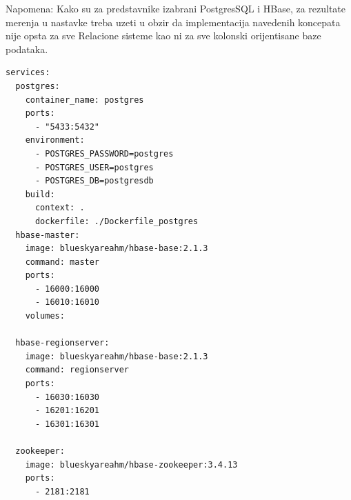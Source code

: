 \documentclass[12pt,oneside]{memoir}
\begin{document}
Napomena: Kako su za predstavnike izabrani PostgresSQL i HBase,  za rezultate merenja u nastavke treba uzeti u obzir da implementacija navedenih koncepata nije opsta za sve Relacione sisteme kao ni za sve kolonski orijentisane baze podataka.



\begin{lstlisting}[title={docker-compose.yml},captionpos=t]
services: 
  postgres:
    container_name: postgres
    ports:
      - "5433:5432"
    environment:
      - POSTGRES_PASSWORD=postgres
      - POSTGRES_USER=postgres
      - POSTGRES_DB=postgresdb
    build:
      context: .
      dockerfile: ./Dockerfile_postgres
  hbase-master:
    image: blueskyareahm/hbase-base:2.1.3
    command: master
    ports:
      - 16000:16000
      - 16010:16010
    volumes:

  hbase-regionserver:
    image: blueskyareahm/hbase-base:2.1.3
    command: regionserver
    ports:
      - 16030:16030
      - 16201:16201
      - 16301:16301

  zookeeper:
    image: blueskyareahm/hbase-zookeeper:3.4.13
    ports:
      - 2181:2181
\end{lstlisting}


\end{document}
